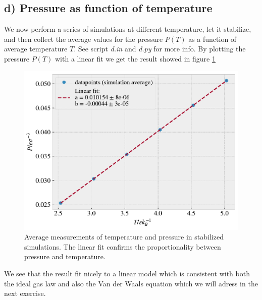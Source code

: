 \documentclass[reprint, amsmath, amssymb, aps]{revtex4-2}
\begin{document}
\subsection*{d) Pressure as function of temperature}
We now perform a series of simulations at different temperature, let it stabilize, and then collect the average values for the pressure $P(T)$ as a function of average temperature $T$. See script \textit{d.in} and \textit{d.py} for more info. By plotting the pressure $P(T)$ with a linear fit we get the result showed in figure \ref{fig:P(T)}
\begin{figure}[H]
  \includegraphics[width=\linewidth]{figures/P(T).pdf}
  \caption{Average measurements of temperature and pressure in stabilized simulations. The linear fit confirms the proportionality between pressure and temperature.}
  \label{fig:P(T)}
\end{figure}
We see that the result fit nicely to a linear model which is consistent with both the ideal gas law and also the Van der Waals equation which we will adress in the next exercise.
%
%
\end{document}
